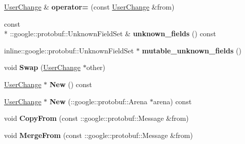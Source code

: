 \begin{DoxyCompactItemize}
\item 
\hypertarget{classSimpleChat_1_1UserChange_ad391b41999e61260da05e2d8b3c8635f}{\hyperlink{classSimpleChat_1_1UserChange}{User\-Change} \& {\bfseries operator=} (const \hyperlink{classSimpleChat_1_1UserChange}{User\-Change} \&from)}\label{classSimpleChat_1_1UserChange_ad391b41999e61260da05e2d8b3c8635f}

\item 
\hypertarget{classSimpleChat_1_1UserChange_ab1379a1c02c0fc0c33c8ffc8c070ed7f}{const \\*
\-::google\-::protobuf\-::\-Unknown\-Field\-Set \& {\bfseries unknown\-\_\-fields} () const }\label{classSimpleChat_1_1UserChange_ab1379a1c02c0fc0c33c8ffc8c070ed7f}

\item 
\hypertarget{classSimpleChat_1_1UserChange_a41d734c4dd617a385ff6d3fcd09247a7}{inline\-::google\-::protobuf\-::\-Unknown\-Field\-Set $\ast$ {\bfseries mutable\-\_\-unknown\-\_\-fields} ()}\label{classSimpleChat_1_1UserChange_a41d734c4dd617a385ff6d3fcd09247a7}

\item 
\hypertarget{classSimpleChat_1_1UserChange_a62ba7a58186d3bbb6b643b8e7409173e}{void {\bfseries Swap} (\hyperlink{classSimpleChat_1_1UserChange}{User\-Change} $\ast$other)}\label{classSimpleChat_1_1UserChange_a62ba7a58186d3bbb6b643b8e7409173e}

\item 
\hypertarget{classSimpleChat_1_1UserChange_a002b6ac71b6aca760862cca40d43fb7b}{\hyperlink{classSimpleChat_1_1UserChange}{User\-Change} $\ast$ {\bfseries New} () const }\label{classSimpleChat_1_1UserChange_a002b6ac71b6aca760862cca40d43fb7b}

\item 
\hypertarget{classSimpleChat_1_1UserChange_a03db0c329841a894c19fa81d06af1986}{\hyperlink{classSimpleChat_1_1UserChange}{User\-Change} $\ast$ {\bfseries New} (\-::google\-::protobuf\-::\-Arena $\ast$arena) const }\label{classSimpleChat_1_1UserChange_a03db0c329841a894c19fa81d06af1986}

\item 
\hypertarget{classSimpleChat_1_1UserChange_abe2909bb1bd29d8f6b76109d297d2bfe}{void {\bfseries Copy\-From} (const \-::google\-::protobuf\-::\-Message \&from)}\label{classSimpleChat_1_1UserChange_abe2909bb1bd29d8f6b76109d297d2bfe}

\item 
\hypertarget{classSimpleChat_1_1UserChange_af0c77bbe4fbb9f176163dbaec55ee1e0}{void {\bfseries Merge\-From} (const \-::google\-::protobuf\-::\-Message \&from)}\label{classSimpleChat_1_1UserChange_af0c77bbe4fbb9f176163dbaec55ee1e0}


\end{DoxyCompactItemize}
